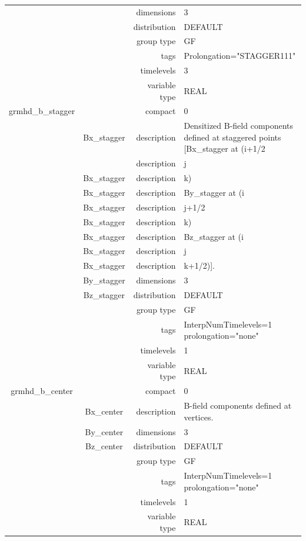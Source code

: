 \documentclass{article}
\begin{document}
\begin{tabular*}{150mm}{|c|c@{\extracolsep{\fill}}|rl|}
 &  & dimensions & 3 \\ 
 &  & distribution & DEFAULT \\ 
 &  & group type & GF \\ 
 &  & tags & Prolongation="STAGGER111" \\ 
 &  & timelevels & 3 \\ 
 &  & variable type & REAL \\ 
\hline 
grmhd\_b\_stagger &  & compact & 0 \\ 
 & Bx\_stagger & description & Densitized B-field components defined at staggered points [Bx\_stagger at (i+1/2 \\ 
& ~ & description & j \\ 
 & Bx\_stagger & description & k) \\ 
 & Bx\_stagger & description & By\_stagger at (i \\ 
 & Bx\_stagger & description & j+1/2 \\ 
 & Bx\_stagger & description & k) \\ 
 & Bx\_stagger & description & Bz\_stagger at (i \\ 
 & Bx\_stagger & description & j \\ 
 & Bx\_stagger & description & k+1/2)]. \\ 
 & By\_stagger & dimensions & 3 \\ 
 & Bz\_stagger & distribution & DEFAULT \\ 
 &  & group type & GF \\ 
 &  & tags & InterpNumTimelevels=1 prolongation="none" \\ 
 &  & timelevels & 1 \\ 
 &  & variable type & REAL \\ 
\hline 
grmhd\_b\_center &  & compact & 0 \\ 
 & Bx\_center & description & B-field components defined at vertices. \\ 
 & By\_center & dimensions & 3 \\ 
 & Bz\_center & distribution & DEFAULT \\ 
 &  & group type & GF \\ 
 &  & tags & InterpNumTimelevels=1 prolongation="none" \\ 
 &  & timelevels & 1 \\ 
 &  & variable type & REAL \\ 
\hline 
\end{tabular*} 



\vspace{5mm}
\vspace{5mm}
\end{document}
